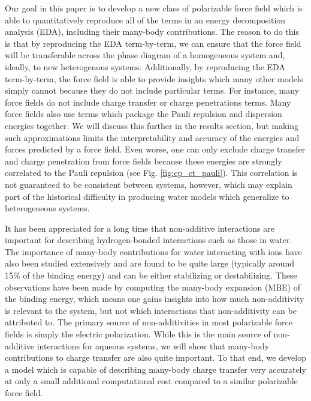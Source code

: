 \documentclass[journal=jacsat,manuscript=article]{achemso}
\begin{document}
 Our goal in this paper is to develop a new class of polarizable force field which is able to quantitatively reproduce all of the terms in an energy decomposition analysis (EDA)\cite{horn2016probing,mao2021intermolecular}, including their many-body contributions. The reason to do this is that by reproducing the EDA term-by-term, we can ensure that the force field will be transferable across the phase diagram of a homogeneous system and, ideally, to new heterogenous systems. Additionally, by reproducing the EDA term-by-term, the force field is able to provide insights which many other models simply cannot because they do not include particular terms. For instance, many force fields do not include charge transfer or charge penetrations terms. Many force fields also use terms which package the Pauli repulsion and dispersion  energies together. We will discuss this further in the results section, but making such approximations limits the interpretability and accuracy of the energies and forces predicted by a force field. Even worse, one can only exclude charge transfer and charge penetration from force fields because these energies are strongly correlated to the Pauli repulsion (see Fig. \ref{fig:cp_ct_pauli}). This correlation is not guaranteed to be consistent between systems, however, which may explain part of the historical difficulty in producing water models which generalize to heterogeneous systems.

 It has been appreciated for a long time that non-additive interactions are important for describing hydrogen-bonded interactions such as those in water.\cite{xantheas2000cooperativity} The importance of many-body contributions for water interacting with ions have also been studied extensively and are found to be quite large (typically around 15\% of the binding energy) and can be either stabilizing or destabilizing.\cite{heindel2021many,herman2021many} These observations have been made by computing the many-body expansion (MBE) of the binding energy\cite{heindel2020many}, which means one gains insights into how much non-additivity is relevant to the system, but not which interactions that non-additivity can be attributed to. The primary source of non-additivities in most polarizable force fields is simply the electric polarization. While this is the main source of non-additive interactions for aqueous systems, we will show that many-body contributions to charge transfer are also quite important. To that end, we develop a model which is capable of describing many-body charge transfer very accurately at only a small additional computational cost compared to a similar polarizable force field.
\end{document}
